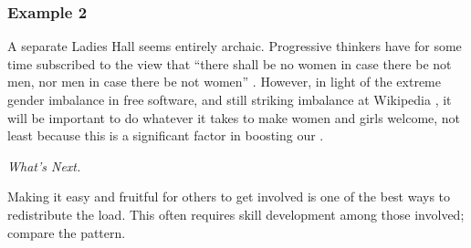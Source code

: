 \subsubsection*{Example 2}
A separate Ladies Hall seems entirely archaic.  Progressive thinkers have for
some time subscribed to the view that ``there shall be no women in
case there be not men, nor men in case there be not women''
\cite[Chapter 1.LII]{rabelais1894gargantua}.  However, in light of the
extreme gender imbalance in free software, and still striking
imbalance at Wikipedia \cite{gender,FM4291}, it will be important to
do whatever it takes to make women and girls welcome, not least
because this is a significant factor in boosting our
.


\begin{framed}
\noindent 
\emph{What's Next.}
\begin{collectinmacro}{\CarryingWN}{}{}
Making it easy and fruitful for others to get involved is one of the best ways to redistribute the load.  This often requires skill development among those involved; compare the  pattern.
\end{collectinmacro}
\CarryingWN
\end{framed}



  

